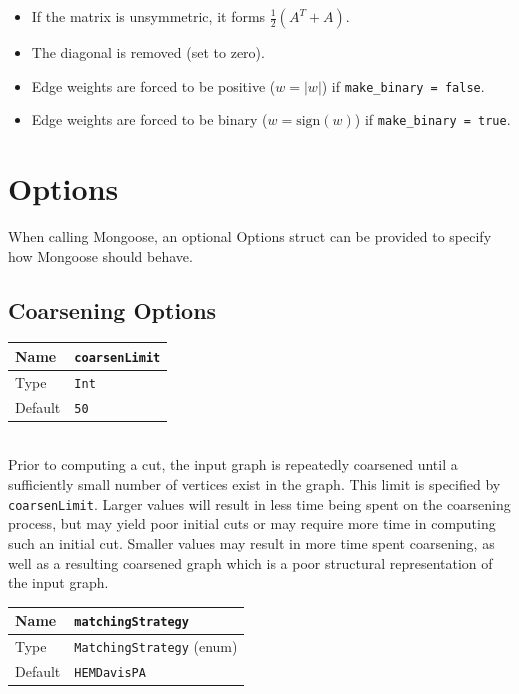 \documentclass[letter]{article}
\begin{document}
\begin{itemize}
\begin{itemize}
\item If the matrix is unsymmetric, it forms $\frac{1}{2}(A^T + A)$.
\item The diagonal is removed (set to zero).
\item Edge weights are forced to be positive ($w = |w|$) if \texttt{make\_binary = false}.
\item Edge weights are forced to be binary ($w = \text{sign}(w)$) if \texttt{make\_binary = true}.
\end{itemize}

\end{itemize}

\section{Options}
\label{sec:options}

When calling Mongoose, an optional Options struct can be provided to specify how Mongoose should behave.

\subsection{Coarsening Options}

\begin{tabular}{|l|l|} \hline
Name & \texttt{coarsenLimit} \\ \hline
Type & \texttt{Int} \\ \hline
Default & \texttt{50} \\ \hline
\end{tabular}\\

Prior to computing a cut, the input graph is repeatedly coarsened until a sufficiently small number of vertices exist in the graph. This limit is specified by \texttt{coarsenLimit}. Larger values will result in less time being spent on the coarsening process, but may yield poor initial cuts or may require more time in computing such an initial cut. Smaller values may result in more time spent coarsening, as well as a resulting coarsened graph which is a poor structural representation of the input graph.

\baselineskip
\begin{tabular}{|l|l|} \hline
Name & \texttt{matchingStrategy} \\ \hline
Type & \texttt{MatchingStrategy} (enum) \\ \hline
Default & \texttt{HEMDavisPA} \\ \hline
\end{tabular}\\
\end{document}

